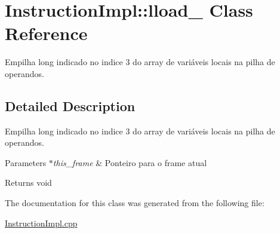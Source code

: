 \hypertarget{class_instruction_impl_1_1lload__3}{}\section{Instruction\+Impl\+:\+:lload\+\_ Class Reference}
\label{class_instruction_impl_1_1lload__3}


Empilha long indicado no indice 3 do array de variáveis locais na pilha de operandos.  




\subsection{Detailed Description}
Empilha long indicado no indice 3 do array de variáveis locais na pilha de operandos. 


\begin{DoxyParams}{Parameters}
{\em $\ast$this\+\_\+frame} & Ponteiro para o frame atual \\
\hline
\end{DoxyParams}
\begin{DoxyReturn}{Returns}
void 
\end{DoxyReturn}


The documentation for this class was generated from the following file\+:\begin{DoxyCompactItemize}
\item 
\hyperlink{_instruction_impl_8cpp}{Instruction\+Impl.\+cpp}\end{DoxyCompactItemize}
